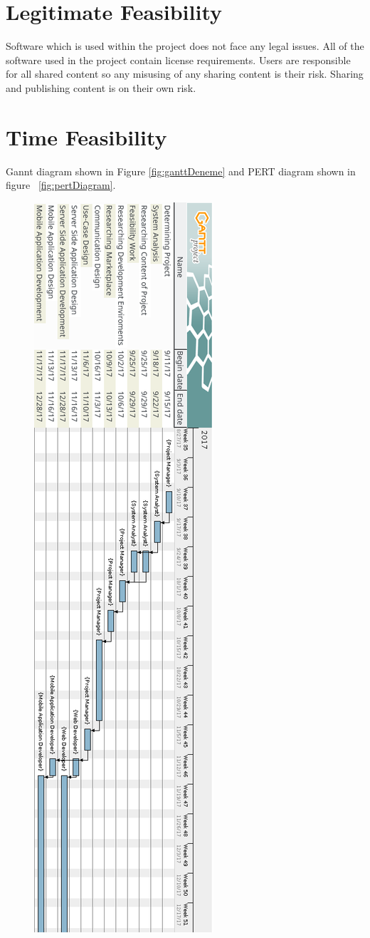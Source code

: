 \section{Legitimate Feasibility}
Software which is used within the project does not face any legal issues. All of the
software used in the project contain license requirements. Users are responsible for
all shared content so any misusing of any sharing content is their risk. Sharing and publishing content is on their own risk.

\newpage
\section{Time Feasibility}
Gannt diagram shown in Figure \ref{fig:ganttDeneme} and PERT diagram shown in figure ~\ref{fig:pertDiagram}.
\begin{figure}[!htbp]
\centering
\includegraphics[scale= 0.64]{projectChapters/images/gant.png}

\end{figure}
